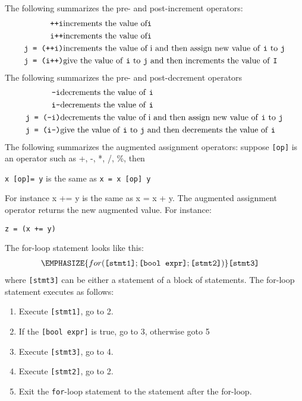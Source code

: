 \begin{console}
\newpage{}

The following summarizes the pre- and post-increment operators:
\begin{align*}
\texttt{++i} &\text{increments the value of} \texttt{i}\\
\texttt{i++} &\text{increments the value of} \texttt{i}\\
\texttt{j = (++i)} &\text{increments the value of i and then assign new value of
\texttt{i} to \texttt{j}}\\
\texttt{j = (i++)} &\text{give the value of \texttt{i} to \texttt{j} and then
increments the value of \texttt{I}}\\
\end{align*}
The following summarizes the pre- and post-decrement operators
\begin{align*}
\texttt{--i} &\text{decrements the value of \texttt{i}}\\
\texttt{i--} &\text{decrements the value of \texttt{i}}\\
\texttt{j = (--i)} &\text{decrements the value of i and then assign new value
of \texttt{i} to \texttt{j}}\\
\texttt{j = (i--)} &\text{give the value of \texttt{i} to \texttt{j} and then
decrements the value of \texttt{i}}\\
\end{align*}
The following summarizes the augmented assignment operators: suppose
\texttt{[op]} is an operator such as +, -, *, /, \%, then
\begin{center}
\texttt{x [op]= y}     is the same as      \texttt{x = x [op] y}
\end{center}
For instance x += y is the same as x = x + y. The augmented assignment
operator returns the new augmented value. For instance:
\begin{center}
\texttt{z = (x += y)}
\end{center}
The for-loop statement looks like this:
\begin{align*}
\EMPHASIZE{for (\texttt{[stmt1]}; \texttt{[bool expr]}; \texttt{[stmt2]})}
&\texttt{[stmt3]}
\end{align*}
where \texttt{[stmt3]} can be either a statement of a block of
statements. The for-loop statement executes as follows:

\begin{enumerate}
\item
  Execute \texttt{[stmt1]}, go to 2.
\item
  If the \texttt{[bool expr]} is true, go to 3, otherwise goto 5
\item
  Execute \texttt{[stmt3]}, go to 4.
\item
  Execute \texttt{[stmt2]}, go to 2.
\item
  Exit the \texttt{for}-loop statement to the statement after the for-loop.
\end{enumerate}


\end{console}
